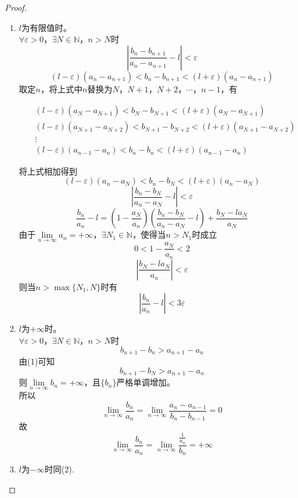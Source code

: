 \begin{proof}

    \begin{enumerate}

        \item
            $l$为有限值时。\\
            $\forall \varepsilon > 0$，$\exists N \in \mathbb{N}$，$n > N$时
            \[\left| \dfrac{b_n - b_{n + 1}}{a_n - a_{n + 1}} - l \right| < \varepsilon\]
            \[(l - \varepsilon)(a_n - a_{n + 1}) < b_n - b_{n + 1} < (l + \varepsilon)(a_n - a_{n + 1})\]
            取定$n$，将上式中$n$替换为$N$，$N + 1$，$N + 2$，$\cdots$，$n - 1$，有

            \begin{align*}
                & (l - \varepsilon)(a_{N} - a_{N + 1}) < b_{N} - b_{N + 1} < (l + \varepsilon)(a_{N} - a_{N + 1}) \\
                & (l - \varepsilon)(a_{N + 1} - a_{N + 2}) < b_{N + 1} - b_{N + 2} < (l + \varepsilon)(a_{N + 1} - a_{N + 2}) \\
                & \vdots \\
                & (l - \varepsilon)(a_{n - 1} - a_{n}) < b_{n} - b_{n} < (l + \varepsilon)(a_{n - 1} - a_{n})
            \end{align*}

            将上式相加得到
            \[(l - \varepsilon)(a_{n} - a_{N}) < b_{n} - b_{N} < (l + \varepsilon)(a_{n} - a_{N})\]
            \[\left| \dfrac{b_n - b_{N}}{a_n - a_{N}} - l \right| < \varepsilon\]
            \[\dfrac{b_n}{a_n} - l = \left( 1 - \dfrac{a_N}{a_n} \right)\left( \dfrac{b_n - b_N}{a_n - a_N} - l \right) + \dfrac{b_N - la_N}{a_N}\]
            由于$\lim\limits_{n \to \infty}{a_n} = +\infty$，$\exists N_1 \in \mathbb{N}$，使得当$n > N_1$时成立
            \[0 < 1 - \dfrac{a_N}{a_n} < 2\]
            \[\left| \dfrac{b_N - la_N}{a_n} \right| < \varepsilon\]
            则当$n > \max\{N_1, N\}$时有
            \[\left| \dfrac{b_n}{a_n} - l \right| < 3\varepsilon\]

        \item
            $l$为$+\infty$时。\\
            $\forall \varepsilon > 0$，$\exists N \in \mathbb{N}$，$n > N$时
            \[b_{n + 1} - b_n > a_{n + 1} - a_n\]
            由\textup{(1)}可知
            \[b_{n + 1} - b_N > a_{n + 1} - a_n\]
            则$\lim\limits_{n \to \infty}{b_n} = +\infty$，且$\{b_n\}$严格单调增加。\\
            所以
            \[\lim\limits_{n \to \infty}{\dfrac{b_n}{a_n}} = \lim\limits_{n \to \infty}{\dfrac{a_n - a_{n - 1}}{b_n - b_{n - 1}}} = 0\]
            故
            \[\lim\limits_{n \to \infty}{\dfrac{b_n}{a_n}} = \lim\limits_{n \to \infty}{\dfrac{\frac{1}{a_n}}{b_n}} = +\infty\]

        \item $l$为$-\infty$时同\textup{(2)}.

    \end{enumerate}

\end{proof}

